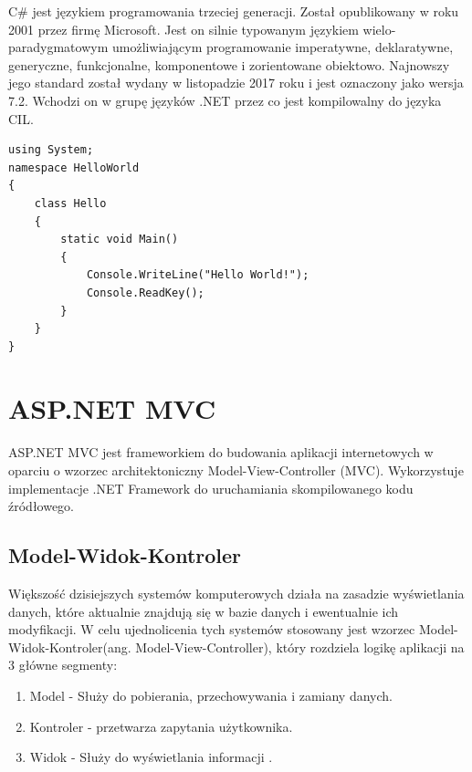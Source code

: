C\# jest językiem programowania trzeciej generacji. Został opublikowany w roku 2001 przez firmę Microsoft. Jest on silnie typowanym językiem wielo-paradygmatowym umożliwiającym programowanie imperatywne, deklaratywne, generyczne, funkcjonalne, komponentowe i zorientowane obiektowo. Najnowszy jego standard został wydany w listopadzie 2017 roku i jest oznaczony jako wersja 7.2. Wchodzi on w grupę języków .NET przez co jest kompilowalny do języka CIL. \cite{CPlotekInfo}
\begin{minipage}{\linewidth}
\begin{lstlisting}[frame=single, numbers=none,captionpos=b, 
caption={Przykładowy kod aplikacji "Hello World" w języku CIL}]
using System;
namespace HelloWorld
{
    class Hello 
    {
        static void Main() 
        {
            Console.WriteLine("Hello World!");
            Console.ReadKey();
        }
    }
}
\end{lstlisting}
\end{minipage}
\newpage
{\let\cleardoublepage\relax \chapter{ASP.NET MVC}}


ASP.NET MVC jest frameworkiem do budowania aplikacji internetowych w oparciu o wzorzec architektoniczny Model-View-Controller (MVC). Wykorzystuje implementacje .NET Framework do uruchamiania skompilowanego kodu źródłowego.


\section{Model-Widok-Kontroler}

Większość dzisiejszych systemów komputerowych działa na zasadzie wyświetlania danych, które aktualnie znajdują się w bazie danych i ewentualnie ich modyfikacji. W celu ujednolicenia tych systemów stosowany jest wzorzec Model-Widok-Kontroler(ang. Model-View-Controller), który rozdziela logikę aplikacji na 3 główne segmenty:
\begin{enumerate}
	\item Model - Służy do pobierania, przechowywania i zamiany danych.
	\item Kontroler - przetwarza zapytania użytkownika.
	\item Widok - Służy do wyświetlania informacji .
\end{enumerate}

